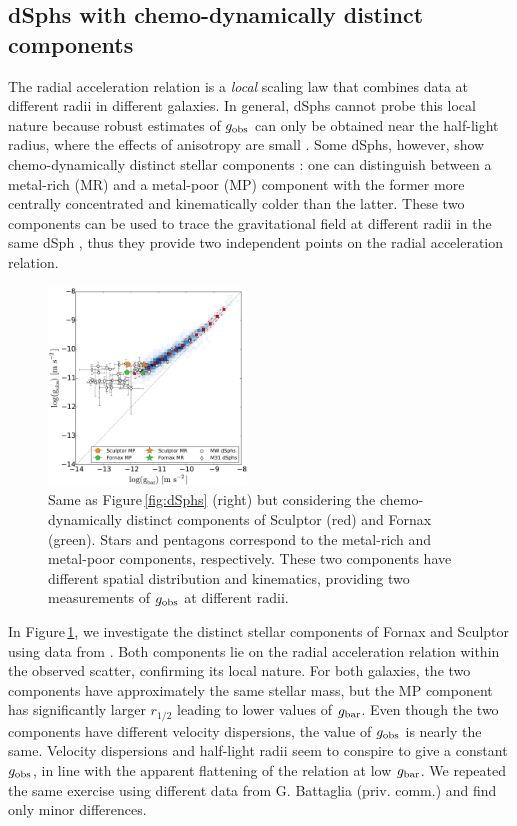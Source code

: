 \documentclass[apjl, twocolappendix]{emulateapj}
\begin{document}
\subsection{dSphs with chemo-dynamically distinct components}

The radial acceleration relation is a \textit{local} scaling law that combines data at different radii in different galaxies. In general, dSphs cannot probe this local nature because robust estimates of $g_{\rm obs}$ can only be obtained near the half-light radius, where the effects of anisotropy are small \citep[e.g.,][]{Wolf2010}. Some dSphs, however, show chemo-dynamically distinct stellar components \citep{Tolstoy2004, Battaglia2006}: one can distinguish between a metal-rich (MR) and a metal-poor (MP) component with the former more centrally concentrated and kinematically colder than the latter. These two components can be used to trace the gravitational field at different radii in the same dSph \citep{Battaglia2008, Walker2011}, thus they provide two independent points on the radial acceleration relation.

\begin{figure}[thb]
\centering
\includegraphics[width=0.47\textwidth]{RAR_dSph2.pdf}
\caption{Same as Figure\,\ref{fig:dSphs} (right) but considering the chemo-dynamically distinct components of Sculptor (red) and Fornax (green). Stars and pentagons correspond to the metal-rich and metal-poor components, respectively. These two components have different spatial distribution and kinematics, providing two measurements of $g_{\rm obs}$ at different radii.}
\label{fig:dSph2}
\end{figure}
In Figure\,\ref{fig:dSph2}, we investigate the distinct stellar components of Fornax and Sculptor using data from \citet{Walker2011}. Both components lie on the radial acceleration relation within the observed scatter, confirming its local nature. For both galaxies, the two components have approximately the same stellar mass, but the MP component has significantly larger $r_{1/2}$ leading to lower values of $g_{\rm bar}$. Even though the two components have different velocity dispersions, the value of $g_{\rm obs}$ is nearly the same. Velocity dispersions and half-light radii seem to conspire to give a constant $g_{\rm obs}$, in line with the apparent flattening of the relation at low $g_{\rm bar}$. We repeated the same exercise using different data from G. Battaglia (priv. comm.) and find only minor differences.
\end{document}
